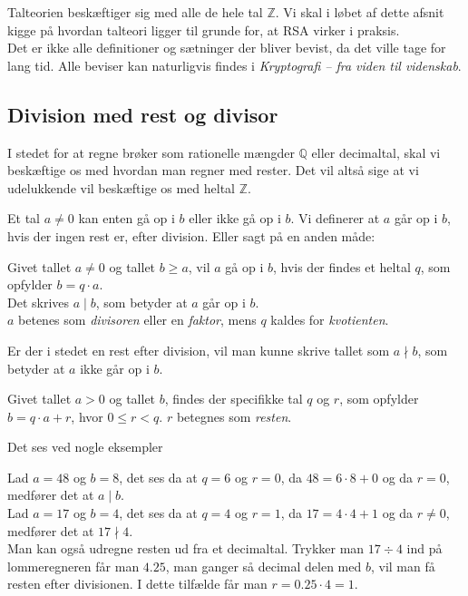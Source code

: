 Talteorien beskæftiger sig med alle de hele tal \(\mathbb{Z}\).
Vi skal i løbet af dette afsnit kigge på hvordan talteori ligger til grunde for, at RSA virker i praksis.
\\
Det er ikke alle definitioner og sætninger der bliver bevist, da det ville tage for lang tid.
Alle beviser kan naturligvis findes i \textit{Kryptografi -- fra viden til videnskab}. \cite{krypto}



\subsection{Division med rest og divisor}
I stedet for at regne brøker som rationelle mængder \(\mathbb{Q}\) eller decimaltal, skal vi beskæftige os med hvordan man regner med rester.
Det vil altså sige at vi udelukkende vil beskæftige os med heltal \(\mathbb{Z}\).

Et tal \(a \neq 0\) kan enten gå op i \(b\) eller ikke gå op i \(b\).
Vi definerer at \(a\) går op i \(b\), hvis der ingen rest er, efter division. Eller sagt på en anden måde:


\begin{definition}
    \label{heldiv}
    Givet tallet \(a \neq 0\) og tallet \(b \geq a\), vil \(a\) gå op i \(b\),
    hvis der findes et heltal \(q\), som opfylder \(b = q \cdot a\).\\
    Det skrives \(a \mid b\), som betyder at \(a\) går op i \(b\).\\
    \(a\) betenes som \textit{divisoren} eller en \textit{faktor},
    mens \(q\) kaldes for \textit{kvotienten}.\cite[70]{krypto}
\end{definition}

Er der i stedet en rest efter division, vil man kunne skrive tallet som \(a \nmid b\), som betyder at \(a\) ikke går op i \(b\).

\begin{sent}
    \label{rest}
    Givet tallet \(a > 0\) og tallet \(b\), findes der specifikke tal \(q\) og \(r\), som opfylder \(b = q \cdot a + r\), hvor \(0 \leq r < q\). \(r\) betegnes som \textit{resten}.
\end{sent}

Det ses ved nogle eksempler

\begin{eks}
    Lad \(a = 48\) og \(b = 8\), det ses da at \(q = 6\) og \(r = 0\), da \(48 = 6 \cdot 8 + 0\) og da \(r = 0\), medfører det at \(a \mid b\).\\

    Lad \(a = 17\) og \(b = 4\), det ses da at \(q = 4\) og \(r = 1\), da \(17 = 4 \cdot 4 + 1\) og da \(r \neq 0\), medfører det at \(17 \nmid 4\).\\

    Man kan også udregne resten ud fra et decimaltal.
    Trykker man \(17 \div 4\) ind på lommeregneren får man \(4.25\), man ganger så decimal delen med \(b\), vil man få resten efter divisionen.
    I dette tilfælde får man \(r = 0.25 \cdot 4 = 1\).
\end{eks}




